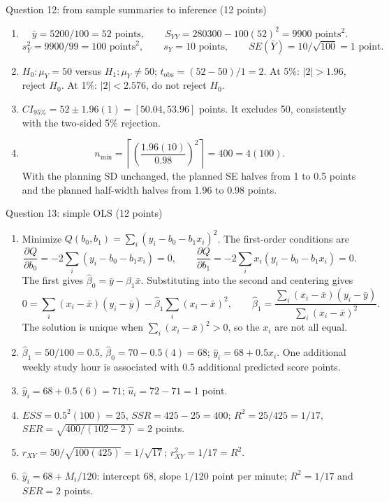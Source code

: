 \documentclass[a4paper,11pt,twoside]{article}
\newcommand{\heading}[1]{\par\medskip\noindent #1\par\nobreak\smallskip}
\begin{document}
\Needspace{4cm}
\heading{Question 12: from sample summaries to inference (12 points)}
\begin{enumerate}[label=(\alph*),leftmargin=*,itemsep=2pt,topsep=2pt]
\item
\[
\bar y=5200/100=52\text{ points},\qquad
S_{YY}=280300-100(52)^2=9900\text{ points}^2.
\]
\[
s_Y^2=9900/99=100\text{ points}^2,\qquad
s_Y=10\text{ points},\qquad SE(\bar Y)=10/\sqrt{100}=1\text{ point}.
\]
\item $H_0:\mu_Y=50$ versus $H_1:\mu_Y\ne50$;
$t_{\mathrm{obs}}=(52-50)/1=2$.
At 5\%: $|2|>1.96$, reject $H_0$.
At 1\%: $|2|<2.576$, do not reject $H_0$.
\item $CI_{95\%}=52\pm1.96(1)=[50.04,53.96]$ points.
It excludes 50, consistently with the two-sided 5\% rejection.
\item
\[
n_{\min}=\left\lceil\left(\frac{1.96(10)}{0.98}\right)^2\right\rceil
=400=4(100).
\]
With the planning SD unchanged, the planned SE halves from 1 to 0.5 points
and the planned half-width halves from 1.96 to 0.98 points.
\end{enumerate}

\heading{Question 13: simple OLS (12 points)}
\begin{enumerate}[label=(\alph*),leftmargin=*,itemsep=3pt,topsep=2pt]
\item Minimize $Q(b_0,b_1)=\sum_i(y_i-b_0-b_1x_i)^2$. The first-order conditions are
\[
\frac{\partial Q}{\partial b_0}=-2\sum_i(y_i-b_0-b_1x_i)=0,
\qquad
\frac{\partial Q}{\partial b_1}=-2\sum_i x_i(y_i-b_0-b_1x_i)=0.
\]
The first gives $\widehat\beta_0=\bar y-\widehat\beta_1\bar x$.
Substituting into the second and centering gives
\[
0=\sum_i(x_i-\bar x)(y_i-\bar y)
-\widehat\beta_1\sum_i(x_i-\bar x)^2,
\qquad
\widehat\beta_1=\frac{\sum_i(x_i-\bar x)(y_i-\bar y)}{\sum_i(x_i-\bar x)^2}.
\]
The solution is unique when $\sum_i(x_i-\bar x)^2>0$, so the $x_i$ are not all equal.
\item $\widehat\beta_1=50/100=0.5$, $\widehat\beta_0=70-0.5(4)=68$;
$\widehat y_i=68+0.5x_i$. One additional weekly study hour is associated with
0.5 additional predicted score points.
\item $\widehat y_i=68+0.5(6)=71$; $\widehat u_i=72-71=1$ point.
\item $ESS=0.5^2(100)=25$, $SSR=425-25=400$;
$R^2=25/425=1/17$, $SER=\sqrt{400/(102-2)}=2$ points.
\item $r_{XY}=50/\sqrt{100(425)}=1/\sqrt{17}$;
$r_{XY}^2=1/17=R^2$.
\item $\widehat y_i=68+M_i/120$: intercept $68$, slope $1/120$ point per minute;
$R^2=1/17$ and $SER=2$ points.
\end{enumerate}
\end{document}

